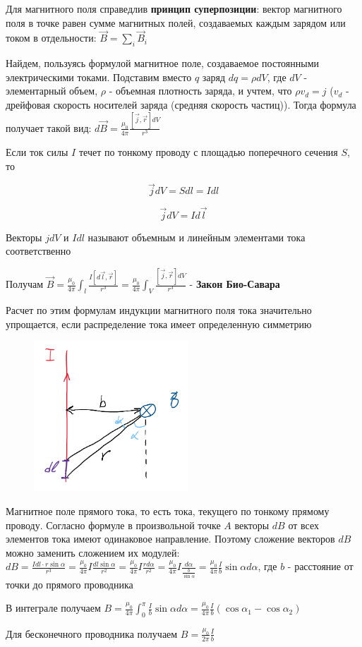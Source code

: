 \documentclass[12pt]{article}
\begin{document}
Для магнитного поля справедлив \textbf{принцип суперпозиции}: вектор магнитного поля в точке равен сумме магнитных полей,
создаваемых каждым зарядом или током в отдельности: $\vec{B} = \sum_i \vec{B}_i$

Найдем, пользуясь формулой магнитное поле, создаваемое постоянными электрическими токами. Подставим вместо $q$ заряд $dq = \rho dV$, где $dV$ - элементарный объем,
$\rho$ - объемная плотность заряда, и учтем, что $\rho v_d = j$ ($v_d$ - дрейфовая скорость носителей заряда (средняя скорость частиц)). 
Тогда формула получает такой вид: $d\vec{B} = \frac{\mu_0}{4\pi} \frac{[\vec{j}, \vec{r}] dV}{r^3}$

Если ток силы $I$ течет по тонкому проводу с площадью поперечного сечения $S$, то 

\[\vec{j} dV = S dl = Idl\]

\[\vec{j} dV = Id\vec{l}\]

Векторы $jdV$ и $Idl$ называют объемным и линейным элементами тока соответственно

Получам $\vec{B} = \frac{\mu_0}{4\pi} \int_l \frac{I[d\vec{l}, \vec{r}]}{r^3} = \frac{\mu_0}{4\pi} \int_V \frac{[\vec{j}, \vec{r}] dV}{r^3}$ - \textbf{Закон Био-Савара}

Расчет по этим формулам индукции магнитного поля тока значительно упрощается, если распределение тока имеет определенную симметрию

\begin{minipage}{\textwidth}
    \begin{figure}
        \includegraphics[width=5.8cm]{physics2/images/physics2_2025_02_10_2}
    \end{figure}

    \Ex Магнитное поле прямого тока, то есть тока, текущего по тонкому прямому проводу. Согласно формуле в произвольной точке $A$
    векторы $dB$ от всех элементов тока имеют одинаковое направление. Поэтому сложение векторов $dB$ можно заменить сложением 
    их модулей: $dB = \frac{Idl \cdot r \sin \alpha}{r^3} = \frac{\mu_0}{4\pi} I \frac{dl \sin\alpha}{r^2} =
    \frac{\mu_0}{4\pi} I \frac{r d\alpha}{r^2} = \frac{\mu_0}{4\pi} I \frac{d\alpha}{\frac{b}{\sin\alpha}} = \frac{\mu_0}{4\pi} \frac{I}{b} \sin \alpha d\alpha$, где $b$ - расстояние от точки до прямого проводника

    В интеграле получаем $B = \frac{\mu_0}{4\pi} \int_{0}^{\pi} \frac{I}{b} \sin \alpha d\alpha = \frac{\mu_0}{4\pi} \frac{I}{b} (\cos \alpha_1 - \cos \alpha_2)$

    Для бесконечного проводника получаем $B = \frac{\mu_0}{2\pi} \frac{I}{b}$
\end{minipage}
\end{document}
